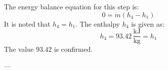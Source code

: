 The energy balance equation for this step is:  
\[
0 = \dot{m} (h_4 - h_1)
\]  
It is noted that \( h_4 = h_1 \).  
The enthalpy \( h_4 \) is given as:  
\[
h_4 = 93.42 \, \frac{\text{kJ}}{\text{kg}} = h_1
\]  
The value \( 93.42 \) is confirmed.

---